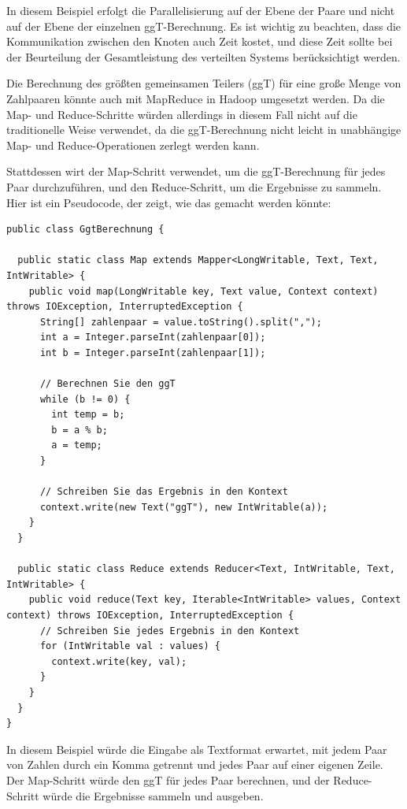In diesem Beispiel erfolgt die Parallelisierung auf der Ebene der Paare und nicht auf der Ebene der einzelnen ggT-Berechnung. Es ist wichtig zu beachten, dass die Kommunikation zwischen den Knoten auch Zeit kostet, und diese Zeit sollte bei der Beurteilung der Gesamtleistung des verteilten Systems berücksichtigt werden.

Die Berechnung des größten gemeinsamen Teilers (ggT) für eine große Menge von Zahlpaaren könnte auch mit MapReduce in Hadoop umgesetzt werden. Da die Map- und Reduce-Schritte würden allerdings in diesem Fall nicht auf die traditionelle Weise verwendet, da die ggT-Berechnung nicht leicht in unabhängige Map- und Reduce-Operationen zerlegt werden kann.

Stattdessen wirt der Map-Schritt verwendet, um die ggT-Berechnung für jedes Paar durchzuführen, und den Reduce-Schritt, um die Ergebnisse zu sammeln. Hier ist ein Pseudocode, der zeigt, wie das gemacht werden könnte:

\begin{lstlisting}[caption={Map- und Reduce},captionpos=b,label={lst:map_e}]
public class GgtBerechnung {

  public static class Map extends Mapper<LongWritable, Text, Text, IntWritable> {
    public void map(LongWritable key, Text value, Context context) throws IOException, InterruptedException {
      String[] zahlenpaar = value.toString().split(",");
      int a = Integer.parseInt(zahlenpaar[0]);
      int b = Integer.parseInt(zahlenpaar[1]);
      
      // Berechnen Sie den ggT
      while (b != 0) {
        int temp = b;
        b = a % b;
        a = temp;
      }
      
      // Schreiben Sie das Ergebnis in den Kontext
      context.write(new Text("ggT"), new IntWritable(a));
    }
  }

  public static class Reduce extends Reducer<Text, IntWritable, Text, IntWritable> {
    public void reduce(Text key, Iterable<IntWritable> values, Context context) throws IOException, InterruptedException {
      // Schreiben Sie jedes Ergebnis in den Kontext
      for (IntWritable val : values) {
        context.write(key, val);
      }
    }
  }
}
\end{lstlisting}

In diesem Beispiel würde die Eingabe als Textformat erwartet, mit jedem Paar von Zahlen durch ein Komma getrennt und jedes Paar auf einer eigenen Zeile. Der Map-Schritt würde den ggT für jedes Paar berechnen, und der Reduce-Schritt würde die Ergebnisse sammeln und ausgeben. 

